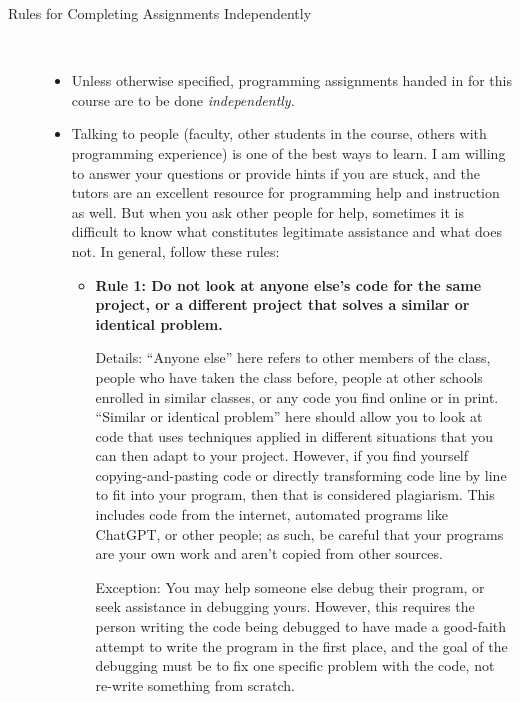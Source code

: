 \documentclass [letterpaper,11pt]{article}
\begin{document}
\begin{description}
\item[Rules for Completing Assignments Independently]\
\begin{itemize}
        \item Unless otherwise specified, programming assignments handed in for this course are to be done \emph{independently}.  
        \item Talking to people (faculty, other students in the course, others with programming experience) is one of the best ways to learn.  I am willing to answer your questions or provide hints if you are stuck, and the tutors are an excellent resource for programming help and instruction as well.  But when you ask other people for help, sometimes
        it is difficult to know what constitutes legitimate assistance and what does not.  In general, follow these rules:
        
        \begin{itemize}
                \item \textbf{Rule 1: Do not look at anyone else's code for the same project, or a different project that solves a similar 
                or identical problem.}
                
                Details: ``Anyone else'' here refers to other members of the class, people who have taken the class before, people at other
                schools enrolled in similar classes, or any code you find online or in print.  ``Similar or identical problem'' here should 
                allow you to look at code that uses techniques applied in different situations that you can then 
                adapt to your project.  However, if you find yourself copying-and-pasting code or directly transforming
                code line by line to fit into your program, then that is considered plagiarism.  This includes code from the internet, automated programs like ChatGPT, or other people; as such, be careful that your programs are your own work and aren't copied from other sources.\newline
                              
                Exception: You may help someone else debug their program, or seek assistance in debugging yours.  However, 
                this requires the person writing the code being debugged to have made a good-faith attempt
                to write the program in the first place, and the goal of the debugging must be to fix
                one specific problem with the code, not re-write something from scratch.\newline
                

\end{itemize}
\end{itemize}
\end{description}
\end{document}
